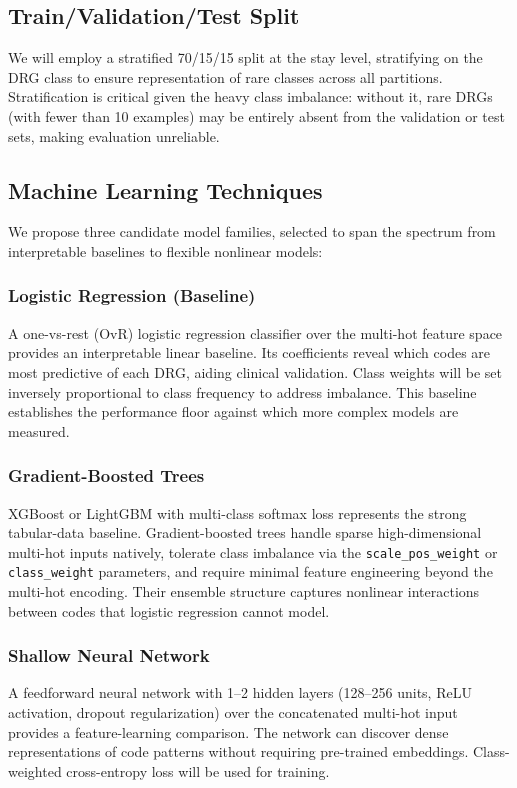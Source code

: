 \subsection{Train/Validation/Test Split}

We will employ a stratified 70/15/15 split at the stay level, stratifying on the DRG class to ensure representation of rare classes across all partitions. Stratification is critical given the heavy class imbalance: without it, rare DRGs (with fewer than 10 examples) may be entirely absent from the validation or test sets, making evaluation unreliable.

\subsection{Machine Learning Techniques}

We propose three candidate model families, selected to span the spectrum from interpretable baselines to flexible nonlinear models:

\subsubsection{Logistic Regression (Baseline)}
A one-vs-rest (OvR) logistic regression classifier over the multi-hot feature space provides an interpretable linear baseline. Its coefficients reveal which codes are most predictive of each DRG, aiding clinical validation. Class weights will be set inversely proportional to class frequency to address imbalance. This baseline establishes the performance floor against which more complex models are measured.

\subsubsection{Gradient-Boosted Trees}
XGBoost or LightGBM with multi-class softmax loss represents the strong tabular-data baseline. Gradient-boosted trees handle sparse high-dimensional multi-hot inputs natively, tolerate class imbalance via the \texttt{scale\_pos\_weight} or \texttt{class\_weight} parameters, and require minimal feature engineering beyond the multi-hot encoding. Their ensemble structure captures nonlinear interactions between codes that logistic regression cannot model.

\subsubsection{Shallow Neural Network}
A feedforward neural network with 1--2 hidden layers (128--256 units, ReLU activation, dropout regularization) over the concatenated multi-hot input provides a feature-learning comparison. The network can discover dense representations of code patterns without requiring pre-trained embeddings. Class-weighted cross-entropy loss will be used for training.

